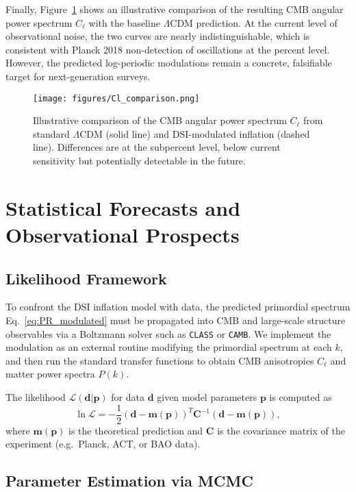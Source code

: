\documentclass[reprint, amsmath, amssymb, aps, prd, nofootinbib]{revtex4-2}
\begin{document}
Finally, Figure~\ref{fig:Clcomp} shows an illustrative comparison of the resulting
CMB angular power spectrum $C_\ell$ with the baseline $\Lambda$CDM prediction.
At the current level of observational noise, the two curves are nearly indistinguishable,
which is consistent with Planck 2018 non-detection of oscillations at the percent level.
However, the predicted log-periodic modulations remain a concrete, falsifiable target
for next-generation surveys.

\begin{figure}[t]
\centering
\texttt{[image: figures/Cl\_comparison.png]}
\caption{Illustrative comparison of the CMB angular power spectrum $C_\ell$
from standard $\Lambda$CDM (solid line) and DSI-modulated inflation (dashed line).
Differences are at the subpercent level, below current sensitivity but potentially
detectable in the future.}
\label{fig:Clcomp}
\end{figure}

\section{Statistical Forecasts and Observational Prospects}

\subsection{Likelihood Framework}

To confront the DSI inflation model with data, the predicted primordial spectrum
Eq.~\eqref{eq:PR_modulated} must be propagated into CMB and large-scale structure
observables via a Boltzmann solver such as \texttt{CLASS} or \texttt{CAMB}.
We implement the modulation as an external routine modifying the primordial
spectrum at each $k$, and then run the standard transfer functions to obtain
CMB anisotropies $C_\ell$ and matter power spectra $P(k)$.

The likelihood $\mathcal{L}(\mathbf{d}|\mathbf{p})$ for data $\mathbf{d}$ given model
parameters $\mathbf{p}$ is computed as
\begin{equation}
\ln \mathcal{L} = -\frac{1}{2}(\mathbf{d}-\mathbf{m}(\mathbf{p}))^T \mathbf{C}^{-1}
(\mathbf{d}-\mathbf{m}(\mathbf{p})),
\end{equation}
where $\mathbf{m}(\mathbf{p})$ is the theoretical prediction and $\mathbf{C}$ is the
covariance matrix of the experiment (e.g.\ Planck, ACT, or BAO data).

\subsection{Parameter Estimation via MCMC}
\end{document}
